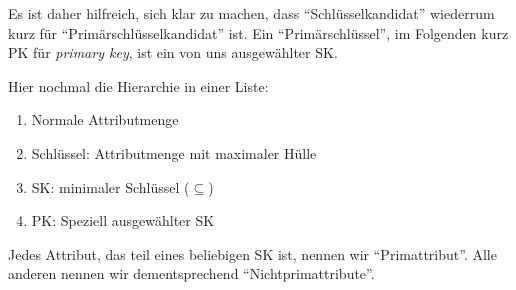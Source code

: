 \documentclass[a4paper, ngerman]{article}
\begin{document}
Es ist daher hilfreich, sich klar zu machen,
dass \enquote{Schlüsselkandidat} wiederrum kurz
für \enquote{Primärschlüsselkandidat} ist.
Ein \enquote{Primärschlüssel},
im Folgenden kurz PK für \emph{primary key},
ist ein von uns ausgewählter SK.

Hier nochmal die Hierarchie in einer Liste:
\begin{enumerate}
    \item Normale Attributmenge
    \item Schlüssel: Attributmenge mit maximaler Hülle
    \item SK: minimaler Schlüssel ($\subseteq$)
    \item PK: Speziell ausgewählter SK
\end{enumerate}

Jedes Attribut,
das teil eines beliebigen SK ist,
nennen wir \enquote{Primattribut}.
Alle anderen nennen wir dementsprechend
\enquote{Nichtprimattribute}.
\end{document}
